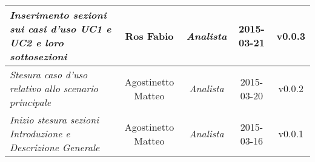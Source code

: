 \newpage
\begin{table}[h]
	\centering
	\begin{tabular}{|p{}|c|c|c|c|}
	\midrule
	        \textit{Inserimento sezioni sui casi d'uso UC1 e UC2 e loro sottosezioni} & Ros Fabio & \textit{Analista} & 2015-03-21 & v0.0.3 \\
	\midrule
		\textit{Stesura caso d'uso relativo allo scenario principale} & Agostinetto Matteo & \textit{Analista} & 2015-03-20 & v0.0.2 \\ 
	\midrule
		\textit{Inizio stesura sezioni Introduzione e Descrizione Generale} & Agostinetto Matteo & \textit{Analista} & 2015-03-16 & v0.0.1 \\
	\bottomrule
\end{tabular}	
\end{table}

\newpage